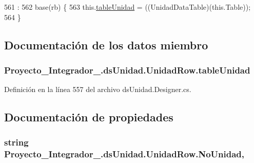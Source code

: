 \begin{DoxyCode}
561                                                                     : 
562                     base(rb) \{
563                 this.\hyperlink{class_proyecto___integrador__3_1_1ds_unidad_1_1_unidad_row_a2d2a9b541845d1cbb13d363af19e5205}{tableUnidad} = ((UnidadDataTable)(this.Table));
564             \}
\end{DoxyCode}


\subsection{Documentación de los datos miembro}
\hypertarget{class_proyecto___integrador__3_1_1ds_unidad_1_1_unidad_row_a2d2a9b541845d1cbb13d363af19e5205}{
\subsubsection[{table\-Unidad}]{ Proyecto\-\_\-\-Integrador\-\_.\-ds\-Unidad.\-Unidad\-Row.\-table\-Unidad\hspace{0.3cm}{\ttfamily [private]}}}\label{class_proyecto___integrador__3_1_1ds_unidad_1_1_unidad_row_a2d2a9b541845d1cbb13d363af19e5205}


Definición en la línea 557 del archivo ds\-Unidad.\-Designer.\-cs.



\subsection{Documentación de propiedades}
\hypertarget{class_proyecto___integrador__3_1_1ds_unidad_1_1_unidad_row_a0b25b1745987d784d4554fb0f34c1f58}{
\subsubsection[{No\-Unidad}]{\setlength{\rightskip}{0pt plus 5cm}string Proyecto\-\_\-\-Integrador\-\_.\-ds\-Unidad.\-Unidad\-Row.\-No\-Unidad\hspace{0.3cm}{\ttfamily [get]}, {\ttfamily [set]}}}\label{class_proyecto___integrador__3_1_1ds_unidad_1_1_unidad_row_a0b25b1745987d784d4554fb0f34c1f58}


